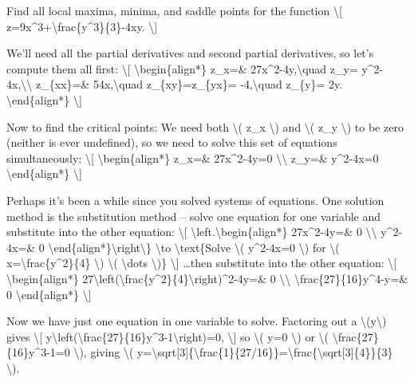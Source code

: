 Find all local maxima, minima, and saddle points for the function
\textbackslash{}{[} z=9x\^{}3+\textbackslash{}frac\{y\^{}3\}\{3\}-4xy.
\textbackslash{}{]}

We'll need all the partial derivatives and second partial derivatives,
so let's compute them all first: \textbackslash{}{[}
\textbackslash{}begin\{align*\} z\_x=\& 27x\^{}2-4y,\textbackslash{}quad
z\_y= y\^{}2-4x,\textbackslash{}\textbackslash{} z\_\{xx\}=\&
54x,\textbackslash{}quad z\_\{xy\}=z\_\{yx\}= -4,\textbackslash{}quad
z\_\{y\}= 2y. \textbackslash{}end\{align*\} \textbackslash{}{]}

Now to find the critical points: We need both \textbackslash{}( z\_x
\textbackslash{}) and \textbackslash{}( z\_y \textbackslash{}) to be
zero (neither is ever undefined), so we need to solve this set of
equations simultaneously: \textbackslash{}{[}
\textbackslash{}begin\{align*\} z\_x=\& 27x\^{}2-4y=0
\textbackslash{}\textbackslash{} z\_y=\& y\^{}2-4x=0
\textbackslash{}end\{align*\} \textbackslash{}{]}

Perhaps it's been a while since you solved systems of equations. One
solution method is the substitution method -- solve one equation for one
variable and substitute into the other equation: \textbackslash{}{[}
\textbackslash{}left.\textbackslash{}begin\{align*\} 27x\^{}2-4y=\& 0
\textbackslash{}\textbackslash{} y\^{}2-4x=\& 0
\textbackslash{}end\{align*\}\textbackslash{}right\textbackslash{}\}
\textbackslash{}to \textbackslash{}text\{Solve \textbackslash{}(
y\^{}2-4x=0 \textbackslash{}) for \textbackslash{}(
x=\textbackslash{}frac\{y\^{}2\}\{4\} \textbackslash{})
\textbackslash{}( \textbackslash{}dots \textbackslash{})\}
\textbackslash{}{]} \ldots{}then substitute into the other equation:
\textbackslash{}{[} \textbackslash{}begin\{align*\}
27\textbackslash{}left(\textbackslash{}frac\{y\^{}2\}\{4\}\textbackslash{}right)\^{}2-4y=\&
0 \textbackslash{}\textbackslash{}
\textbackslash{}frac\{27\}\{16\}y\^{}4-y=\& 0
\textbackslash{}end\{align*\} \textbackslash{}{]}

Now we have just one equation in one variable to solve. Factoring out a
\textbackslash{}(y\textbackslash{}) gives \textbackslash{}{[}
y\textbackslash{}left(\textbackslash{}frac\{27\}\{16\}y\^{}3-1\textbackslash{}right)=0,
\textbackslash{}{]} so \textbackslash{}( y=0 \textbackslash{}) or
\textbackslash{}( \textbackslash{}frac\{27\}\{16\}y\^{}3-1=0
\textbackslash{}), giving \textbackslash{}(
y=\textbackslash{}sqrt{[}3{]}\{\textbackslash{}frac\{1\}\{27/16\}\}=\textbackslash{}frac\{\textbackslash{}sqrt{[}3{]}\{4\}\}\{3\}
\textbackslash{}).

